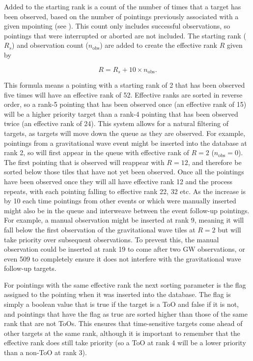 \begin{colsection}
\begin{colsection}
Added to the starting rank is a count of the number of times that a target has been observed, based on the number of pointings previously associated with a given mpointing (see ). This count only includes successful observations, so pointings that were interrupted or aborted are not included. The starting rank ($R_s$) and observation count ($n_\text{obs}$) are added to create the effective rank $R$ given by

\begin{equation}
    R = R_s + 10\times n_\text{obs}.
    \label{eq:effective_rank}
\end{equation}

This formula means a pointing with a starting rank of 2 that has been observed five times will have an effective rank of 52. Effective ranks are sorted in reverse order, so a rank-5 pointing that has been observed once (an effective rank of 15) will be a higher priority target than a rank-4 pointing that has been observed twice (an effective rank of 24). This system allows for a natural filtering of targets, as targets will move down the queue as they are observed. For example, pointings from a gravitational wave event might be inserted into the database at rank 2, so will first appear in the queue with effective rank of $R=2$ ($n_\text{obs}=0$). The first pointing that is observed will reappear with $R=12$, and therefore be sorted below those tiles that have not yet been observed. Once all the pointings have been observed once they will all have effective rank 12 and the process repeats, with each pointing falling to effective rank 22, 32 etc. As the increase is by 10 each time pointings from other events or which were manually inserted might also be in the queue and interweave between the event follow-up pointings. For example, a manual observation might be inserted at rank 9, meaning it will fall below the first observation of the gravitational wave tiles at $R=2$ but will take priority over subsequent observations. To prevent this, the manual observation could be inserted at rank 19 to come after two GW observations, or even 509 to completely ensure it does not interfere with the gravitational wave follow-up targets.

For pointings with the same effective rank the next sorting parameter is the  flag assigned to the pointing when it was inserted into the database. The flag is simply a boolean value that is true if the target is a ToO and false if it is not, and pointings that have the flag as true are sorted higher than those of the same rank that are not ToOs. This ensures that time-sensitive targets come ahead of other targets at the same rank, although it is important to remember that the effective rank does still take priority (so a ToO at rank 4 will be a lower priority than a non-ToO at rank 3).


\end{colsection}
\end{colsection}

